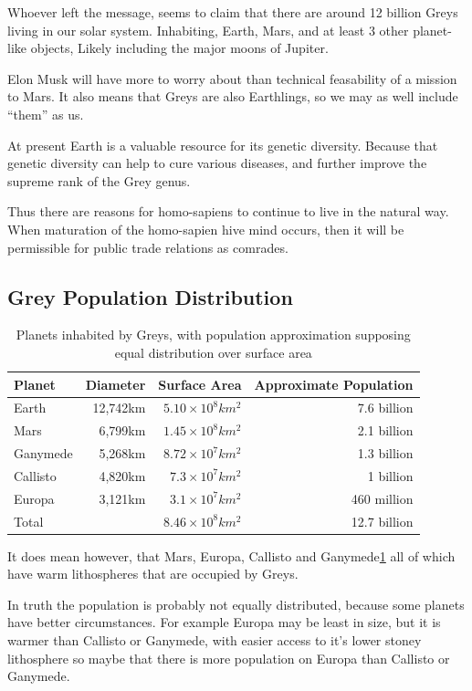 \documentclass{report}
\begin{document}
Whoever left the message, seems to claim that there are around 12 billion
Greys living in our solar system. Inhabiting, Earth, Mars, and at least 3 other
planet-like objects, Likely including the major moons of Jupiter. 

Elon Musk will have more to worry about than technical feasability of a mission
to Mars. It also means that Greys are also Earthlings, so we may as well include
``them'' as us. 

At present Earth is a valuable resource for its genetic diversity. Because that
genetic diversity can help to cure various diseases, and further improve the
supreme rank of the Grey genus. 

Thus there are reasons for homo-sapiens to continue to live in the natural way.
When maturation of the homo-sapien hive mind occurs, then it will be
permissible for public trade relations as comrades.

\subsection{Grey Population Distribution}
\label{populationdistribution}
\begin{table}
\begin{tabular}{lrrr}
  Planet & Diameter & Surface Area & Approximate Population\\
\midrule
  Earth & 12,742km & $5.10\times10^8km^2$& 7.6 billion\\
  Mars & 6,799km & $1.45\times10^8km^2$& 2.1 billion \\
  Ganymede & 5,268km & $8.72\times10^7km^2$ & 1.3 billion \\
  Callisto & 4,820km & $7.3\times10^7km^2$ & 1 billion\\
  Europa & 3,121km & $3.1\times10^7km^2$& 460 million\\
\midrule
  Total &   & $8.46\times10^8km^2$ & 12.7 billion\\
\end{tabular}
\caption{Planets inhabited by Greys, with population approximation supposing
equal distribution over surface area}
\label{table:planets}
\end{table}

It does mean however, that Mars, Europa, Callisto and 
Ganymede\ref{table:planets} all of which
have warm lithospheres that are occupied by Greys. 

In truth the population is probably not equally distributed, because some
planets have better circumstances. For example Europa may be least in size, but
it is warmer than Callisto or Ganymede, with easier access to it's lower stoney
lithosphere so maybe that there is more population on Europa than Callisto or
Ganymede. 
\end{document}
